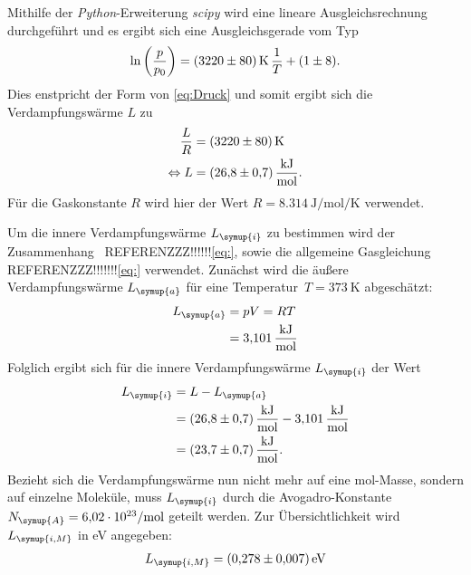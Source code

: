 Mithilfe der 
\textit{Python}-Erweiterung \textit{scipy}\cite{scipy} wird eine lineare Ausgleichsrechnung durchgeführt und es ergibt sich eine
Ausgleichsgerade vom Typ
\begin{equation*}
  \ln\left(\frac{p}{p_0}\right)= \qty{3220+-80}{\kelvin} \, \frac{1}{T} + (\num{1+-8}).
\end{equation*}
Dies enstpricht der Form von \eqref{eq:Druck} und somit ergibt sich die Verdampfungswärme $L$ zu
\begin{align*}
  \frac{L}{R} &= \qty{3220+-80}{\kelvin} \\
  \Leftrightarrow L &= \qty{26,8+-0,7}{\kilo\joule\per\mol}.
\end{align*}
Für die Gaskonstante $R$ wird hier der Wert $R = \qty{8,314}{\joule\per\mol\per\kelvin}$ \cite{czichos} verwendet.

Um die innere Verdampfungswärme $L_{\symup{i}}$ zu bestimmen wird der Zusammenhang~ REFERENZZZ!!!!!!\eqref{eq:}, sowie die allgemeine 
Gasgleichung~ REFERENZZZ!!!!!!!\eqref{eq:} verwendet. Zunächst wird die äußere Verdampfungswärme $L_{\symup{a}}$ für eine 
Temperatur~$T = \qty{373}{\kelvin}$ abgeschätzt:
\begin{align*}
  L_{\symup{a}} &= pV = RT \\
                &= \qty{3,101}{\kilo\joule\per\mol}
\end{align*}
Folglich ergibt sich für die innere Verdampfungswärme $L_{\symup{i}}$ der Wert
\begin{align*}
  L_{\symup{i}} &= L - L_{\symup{a}} \\
                &= \qty{26,8+-0,7}{\kilo\joule\per\mol} - \qty{3,101}{\kilo\joule\per\mol} \\
                &= \qty{23,7+-0,7}{\kilo\joule\per\mol}.
\end{align*}
Bezieht sich die Verdampfungswärme nun nicht mehr auf eine mol-Masse, sondern auf einzelne Moleküle, muss $L_{\symup{i}}$ durch die
Avogadro-Konstante $N_{\symup{A}}=\qty{6,02e23}{\per\mol}$ \cite{czichos} geteilt werden. Zur Übersichtlichkeit wird $L_{\symup{i, M}}$ in eV angegeben:
\begin{align*}
  L_{\symup{i, M}} = \qty{0.278+-0.007}{\electronvolt}
\end{align*}

